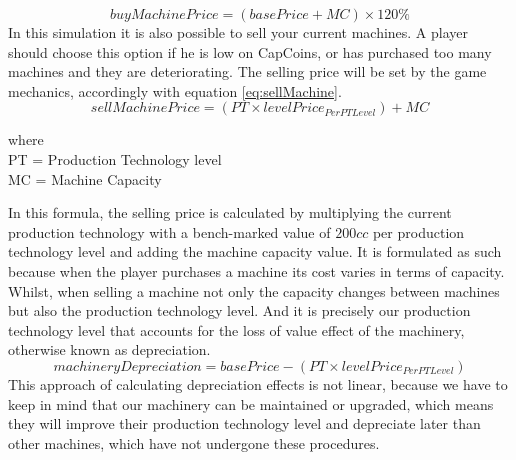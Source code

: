 \begin{equation}
buyMachinePrice=(basePrice+MC)\times 120\%
\label{eq:buyMachine}
\end{equation}
In this simulation it is also possible to sell your current machines. A player should choose this option if he is low on CapCoins, or has purchased too many machines and they are deteriorating. The selling price will be set by the game mechanics, accordingly with equation \ref{eq:sellMachine}.
\begin{equation}
sellMachinePrice=(PT \times levelPrice_{PerPTLevel})+MC
\label{eq:sellMachine}
\end{equation}
\begin{center}
	where\\
	PT = Production Technology level \\
	MC = Machine Capacity
\end{center}
In this formula, the selling price is calculated by multiplying the current production technology with a bench-marked value of $200cc$ per production technology level and adding the machine capacity value. It is formulated as such because when the player purchases a machine its cost varies in terms of capacity. Whilst, when selling a machine not only the capacity changes between machines but also the production technology level. And it is precisely our production technology level that accounts for the loss of value effect of the machinery, otherwise known as depreciation. 
\begin{equation}
machineryDepreciation= basePrice - (PT \times levelPrice_{PerPTLevel})
    \label{eq:machineDepreciation}
\end{equation}
This approach of calculating depreciation effects is not linear, because we have to keep in mind that our machinery can be maintained or upgraded, which means they will improve their production technology level and depreciate later than other machines, which have not undergone these procedures.

